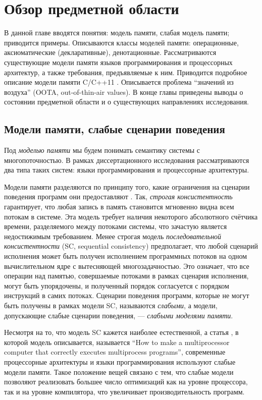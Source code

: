 \chapter{Обзор предметной области} \label{sec:overview}
В данной главе вводятся понятия: модель памяти, слабая модель памяти;
приводится примеры. Описываются
классы моделей памяти: операционные, аксиоматические (декларативные),
денотационные.
Рассматриваются существующие модели памяти языков программирования и
процессорных архитектур, а также требования, предъявляемые к ним.
Приводится подробное описание модели памяти C/C++11 \cite{Batty-al:POPL11}.
Описывается проблема ``значений из воздуха'' (OOTA, out-of-thin-air values).
В конце главы приведены выводы о состоянии предметной области и о существующих
направлениях исследования.

\section{Модели памяти, слабые сценарии поведения}
Под \emph{моделью памяти} мы будем понимать семантику системы с многопоточностью.
В рамках диссертационного исследования рассматриваются два типа таких систем:
языки программирования и процессорные архитектуры.

Модели памяти разделяются по принципу того, какие ограничения на сценарии поведения
программ они предоставляют \cite{Kshemkalyani-Singhal:2011}.
Так, \emph{строгая консистентность} гарантирует, что любая запись в память становится мгновенно видна
всем потокам в системе. Эта модель требует наличия некоторого абсолютного счётчика времени, разделяемого между потоками системы,
что зачастую является недостижимым требованием. Менее строгая модель \emph{последовательной консистентности} \cite{Lamport:TC79}
(SC, sequential consistency)
предполагает, что любой сценарий исполнения может быть получен исполнением программных потоков на одном вычислительном
ядре с вытесняющей многозадачностью. Это означает, что все операции над памятью, совершаемые потоками в рамках сценария исполнения,
могут быть упорядочены, и полученный порядок согласуется с порядком инструкций в самих потоках.
Сценарии поведения программ, которые не могут быть получены в рамках модели SC, называются
\emph{слабыми}, а модели, допускающие слабые сценарии поведения, --- \emph{слабыми моделями памяти}.

Несмотря на то, что модель SC кажется наиболее естественной, а статья \cite{Lamport:TC79},
в которой модель описывается, называется ``How to make a multiprocessor computer that correctly executes multiprocess programs'',
современные процессорные архитектуры и языки программирования используют слабые модели памяти. Такое положение вещей
связано с тем, что слабые модели позволяют реализовать большее число оптимизаций как на уровне процессора, так и на уровне
компилятора, что увеличивает производительность программ.


